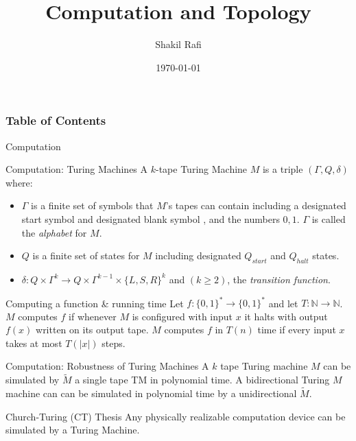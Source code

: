 \documentclass{beamer}
\title[Short title]{Computation and Topology}
\author{Shakil Rafi}
\institute[University of Arkansas] 
{
University of Arkansas \\ 
\medskip
}
\date{\today}
\begin{document}
\nocite{*}
\begin{frame}
\titlepage 
\end{frame}

\begin{frame}
\frametitle{Table of Contents} 
    \tableofcontents 
\end{frame}

\begin{section}{Computation}

\begin{frame}{Computation: Turing Machines}
        A $k$-tape Turing Machine $M$ is a triple $(\Gamma, Q, \delta)$ where:
        \begin{itemize}
            \item $\Gamma$ is a finite set of symbols that $M$'s tapes can contain including a designated start symbol \faPlay and designated blank symbol \faStop, and the numbers $0,1$. $\Gamma$ is called the \textit{alphabet} for $M$.
            \item $Q$ is a finite set of states for $M$ including designated $Q_{start}$ and $Q_{halt}$ states.
            \item $\delta: Q\times \Gamma^k \rightarrow Q \times \Gamma^{k-1}\times \{L,S,R\}^k$ and $(k\geq 2)$, the \textit{transition function}. 
        \end{itemize}
        
        \begin{block}{Computing a function \& running time}
        Let $f:\{0,1\}^*\rightarrow \{0,1\}^*$ and let $T:\mathbb{N}\rightarrow \mathbb{N}$. $M$ computes $f$ if whenever $M$ is configured with input $x$ it halts with output $f(x)$ written on its output tape. $M$ computes $f$ in $T(n)$ time if every input $x$ takes at most $T(|x|)$ steps. 
    \end{block}
\end{frame}

\begin{frame}{Computation: Robustness of Turing Machines}
        A $k$ tape Turing machine $M$ can be simulated by $\tilde{M}$ a single tape TM in polynomial time.
        \newline
        \newline
        A bidirectional Turing $M$ machine can can be simulated in polynomial time by a unidirectional $\tilde{M}$.

    
    \begin{block}{Church-Turing (CT) Thesis}
        Any physically realizable computation device can be simulated by a Turing Machine. 
\end{block}
    

\end{frame}
\end{section}
\end{document}
